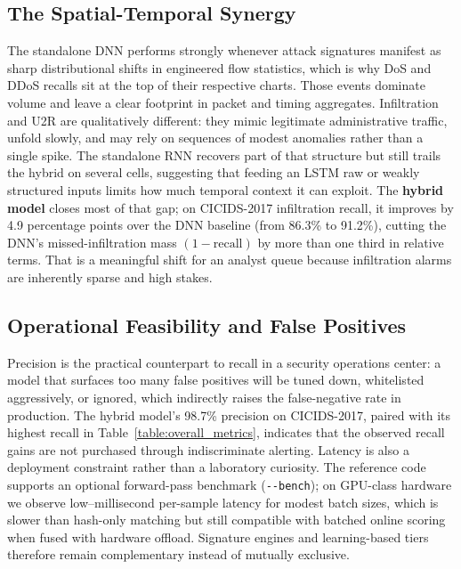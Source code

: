 \documentclass[10pt, conference, compsocconf, letterpaper, twocolumn, twoside]{IEEEtran}
\begin{document}
\subsection{The Spatial-Temporal Synergy}
The standalone DNN performs strongly whenever attack signatures manifest as sharp distributional shifts in engineered flow statistics, which is why DoS and DDoS recalls sit at the top of their respective charts. Those events dominate volume and leave a clear footprint in packet and timing aggregates. Infiltration and U2R are qualitatively different: they mimic legitimate administrative traffic, unfold slowly, and may rely on sequences of modest anomalies rather than a single spike. The standalone RNN recovers part of that structure but still trails the hybrid on several cells, suggesting that feeding an LSTM raw or weakly structured inputs limits how much temporal context it can exploit. The \textbf{hybrid model} closes most of that gap; on CICIDS-2017 infiltration recall, it improves by 4.9 percentage points over the DNN baseline (from 86.3\% to 91.2\%), cutting the DNN's missed-infiltration mass $(1-\text{recall})$ by more than one third in relative terms. That is a meaningful shift for an analyst queue because infiltration alarms are inherently sparse and high stakes.

\subsection{Operational Feasibility and False Positives}
Precision is the practical counterpart to recall in a security operations center: a model that surfaces too many false positives will be tuned down, whitelisted aggressively, or ignored, which indirectly raises the false-negative rate in production. The hybrid model's 98.7\% precision on CICIDS-2017, paired with its highest recall in Table~\ref{table:overall_metrics}, indicates that the observed recall gains are not purchased through indiscriminate alerting. Latency is also a deployment constraint rather than a laboratory curiosity. The reference code supports an optional forward-pass benchmark (\texttt{{-}{-}bench}); on GPU-class hardware we observe low--millisecond per-sample latency for modest batch sizes, which is slower than hash-only matching but still compatible with batched online scoring when fused with hardware offload. Signature engines and learning-based tiers therefore remain complementary instead of mutually exclusive.
\end{document}
